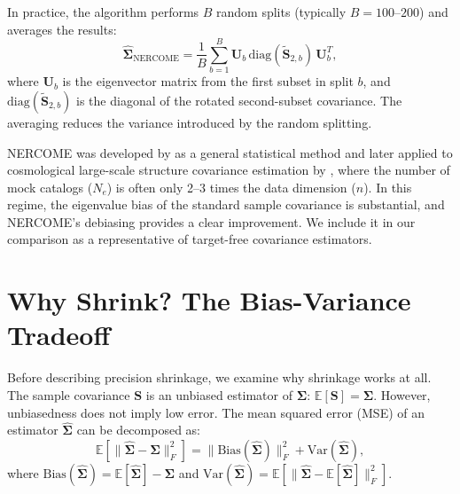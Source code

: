 In practice, the algorithm performs $B$ random splits (typically $B = 100$--$200$) and averages the results:
\begin{equation}
\label{eq:nercome_avg}
\hat{\boldsymbol{\Sigma}}_{\text{NERCOME}} = \frac{1}{B} \sum_{b=1}^{B} \mathbf{U}_b \, \text{diag}(\tilde{\mathbf{S}}_{2,b}) \, \mathbf{U}_b^T,
\end{equation}
where $\mathbf{U}_b$ is the eigenvector matrix from the first subset in split $b$, and $\text{diag}(\tilde{\mathbf{S}}_{2,b})$ is the diagonal of the rotated second-subset covariance. The averaging reduces the variance introduced by the random splitting.

NERCOME was developed by \citet{lam2016nonparametric} as a general statistical method and later applied to cosmological large-scale structure covariance estimation by \citet{joachimi2017non}, where the number of mock catalogs ($N_e$) is often only 2--3 times the data dimension ($n$). In this regime, the eigenvalue bias of the standard sample covariance is substantial, and NERCOME's debiasing provides a clear improvement. We include it in our comparison as a representative of target-free covariance estimators.

\section{Why Shrink? The Bias-Variance Tradeoff}
\label{sec:bias_variance}

Before describing precision shrinkage, we examine why shrinkage works at all. The sample covariance $\mathbf{S}$ is an unbiased estimator of $\boldsymbol{\Sigma}$: $\mathbb{E}[\mathbf{S}] = \boldsymbol{\Sigma}$. However, unbiasedness does not imply low error. The mean squared error (MSE) of an estimator $\hat{\boldsymbol{\Sigma}}$ can be decomposed as:
\begin{equation}
\label{eq:mse_decomposition}
\mathbb{E}[\|\hat{\boldsymbol{\Sigma}} - \boldsymbol{\Sigma}\|_F^2] = \|\text{Bias}(\hat{\boldsymbol{\Sigma}})\|_F^2 + \text{Var}(\hat{\boldsymbol{\Sigma}}),
\end{equation}
where $\text{Bias}(\hat{\boldsymbol{\Sigma}}) = \mathbb{E}[\hat{\boldsymbol{\Sigma}}] - \boldsymbol{\Sigma}$ and $\text{Var}(\hat{\boldsymbol{\Sigma}}) = \mathbb{E}[\|\hat{\boldsymbol{\Sigma}} - \mathbb{E}[\hat{\boldsymbol{\Sigma}}]\|_F^2]$.

